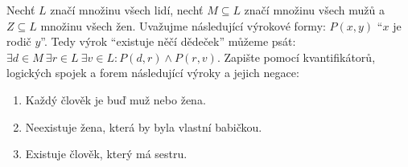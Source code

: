 Nechť $L$ značí množinu všech lidí, nechť $M \subseteq L$ značí množinu všech mužů a $Z \subseteq L$ množinu všech žen.
Uvažujme následující výrokové formy:
$P(x, y)$ ``$x$ je rodič $y$''.
Tedy výrok ``existuje něčí dědeček'' můžeme psát: $\exists d \in M \  \exists r \in L \  \exists v \in L \colon P(d, r) \wedge P(r, v)$.
Zapište pomocí kvantifikátorů, logických spojek a forem následující výroky a jejich negace:
\begin{enumerate}
	\item  Každý člověk je buď muž nebo žena.
	\item  Neexistuje žena, která by byla vlastní babičkou.
	\item  Existuje člověk, který má sestru.
\end{enumerate}

